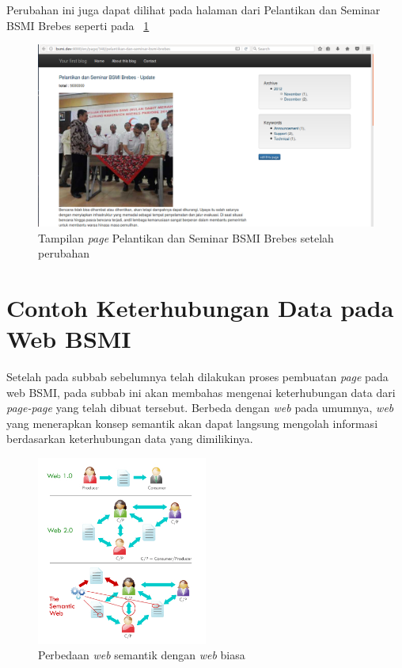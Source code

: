 Perubahan ini juga dapat dilihat pada halaman dari Pelantikan dan Seminar BSMI Brebes seperti pada \pic~\ref{fig:viewprogram5}
\begin{figure}
	\centering
	\includegraphics[width=1\textwidth]
	{pics/29-viewprogramupdatedonation.png}
	\caption{Tampilan \textit{page} Pelantikan dan Seminar BSMI Brebes setelah perubahan}
	\label{fig:viewprogram5}
\end{figure}
\vspace{-0.3cm}

\section{Contoh Keterhubungan Data pada Web BSMI}

Setelah pada subbab sebelumnya telah dilakukan proses pembuatan \textit{page} pada web BSMI, pada subbab ini akan membahas mengenai keterhubungan data dari \textit{page-page} yang telah dibuat tersebut. Berbeda dengan \textit{web} pada umumnya, \textit{web} yang menerapkan konsep semantik akan dapat langsung mengolah informasi berdasarkan keterhubungan data yang dimilikinya.

\begin{figure}
	\centering
	\includegraphics[width=0.5\textwidth]
	{pics/semantic-web.jpg}
	\caption{Perbedaan \textit{web} semantik dengan \textit{web} biasa}
	\label{fig:semanticweb}
\end{figure}
\vspace{-0.3cm}

